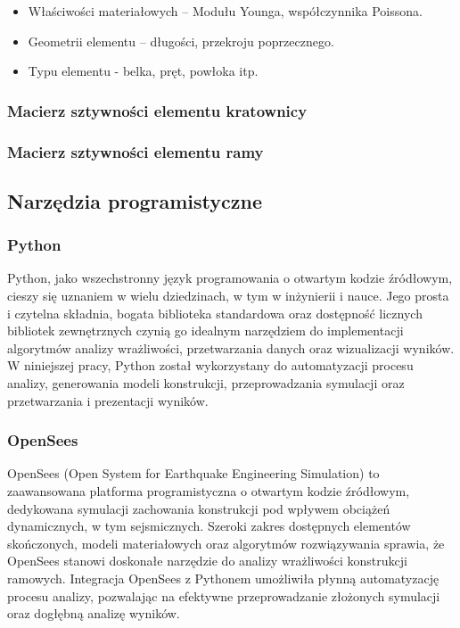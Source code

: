 \begin{itemize}
    \item Właściwości materiałowych – Modułu Younga, współczynnika Poissona.
    \item Geometrii elementu – długości, przekroju poprzecznego.
    \item Typu elementu - belka, pręt, powłoka itp.
\end{itemize}

\subsubsection*{Macierz sztywności elementu kratownicy}



\subsubsection*{Macierz sztywności elementu ramy}

\subsection{Narzędzia programistyczne}
\subsubsection{Python}

Python, jako wszechstronny język programowania o otwartym kodzie źródłowym, cieszy się uznaniem w wielu dziedzinach, w tym w inżynierii i nauce.
Jego prosta i czytelna składnia, bogata biblioteka standardowa oraz dostępność licznych bibliotek zewnętrznych czynią go idealnym narzędziem do implementacji algorytmów analizy wrażliwości, przetwarzania danych oraz wizualizacji wyników.
W niniejszej pracy, Python został wykorzystany do automatyzacji procesu analizy, generowania modeli konstrukcji, przeprowadzania symulacji oraz przetwarzania i prezentacji wyników.

\subsubsection{OpenSees}

OpenSees (Open System for Earthquake Engineering Simulation) to zaawansowana platforma programistyczna o otwartym kodzie źródłowym, dedykowana symulacji zachowania konstrukcji pod wpływem obciążeń dynamicznych, w tym sejsmicznych.
Szeroki zakres dostępnych elementów skończonych, modeli materiałowych oraz algorytmów rozwiązywania sprawia, że OpenSees stanowi doskonałe narzędzie do analizy wrażliwości konstrukcji ramowych.
Integracja OpenSees z Pythonem umożliwiła płynną automatyzację procesu analizy, pozwalając na efektywne przeprowadzanie złożonych symulacji oraz dogłębną analizę wyników.